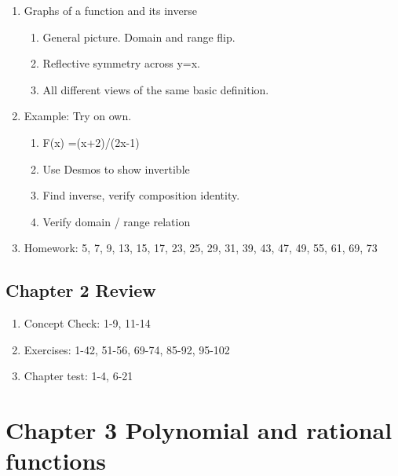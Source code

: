 \documentclass{article}
\begin{document}
\begin{enumerate}
\item Graphs of a function and its inverse
\begin{enumerate}
\item General picture. Domain and range flip. 
\item Reflective symmetry across y=x. 
\item All different views of the same basic definition.
\end{enumerate}

\item Example: Try on own.
\begin{enumerate}
\item F(x) =(x+2)/(2x-1)
\item Use Desmos to show invertible
\item Find inverse, verify composition identity.
\item Verify domain / range relation
\end{enumerate}

\item Homework: 5, 7, 9, 13, 15, 17, 23, 25, 29, 31, 39, 43, 47, 49, 55, 61, 69, 73
\end{enumerate}

\subsection{Chapter 2 Review}

\begin{enumerate}
\item Concept Check: 1-9, 11-14
\item Exercises: 1-42, 51-56, 69-74, 85-92, 95-102
\item Chapter test: 1-4, 6-21
\end{enumerate}


\section{Chapter 3 Polynomial and rational functions}
\end{document}
